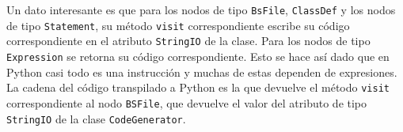 Un dato interesante es que para los nodos de tipo \verb|BsFile|, \verb|ClassDef| y los nodos de tipo \verb|Statement|, su m\'etodo \verb|visit| correspondiente escribe su c\'odigo correspondiente en el atributo \verb|StringIO| de la clase. Para los nodos de tipo \verb|Expression| se retorna su c\'odigo correspondiente. Esto se hace as\'i dado que en Python casi todo es una instrucci\'on y muchas de estas dependen de expresiones. La cadena del c\'odigo transpilado a Python es la que devuelve el m\'etodo \verb|visit| correspondiente al nodo \verb|BSFile|, que devuelve el valor del atributo de tipo \verb|StringIO| de la clase \verb|CodeGenerator|. 

